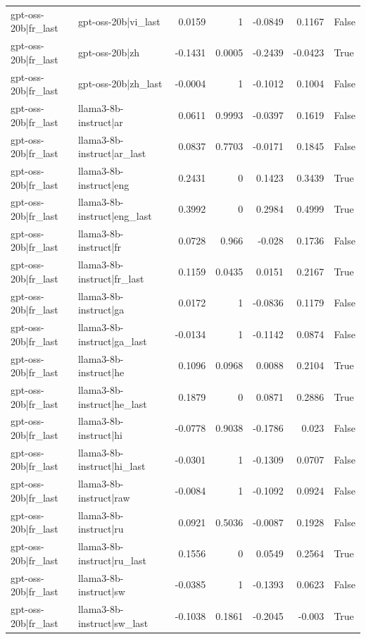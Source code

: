 \begin{table}
\begin{tabular}{l l r r r r l}
gpt-oss-20b|fr_last & gpt-oss-20b|vi_last & 0.0159 & 1 & -0.0849 & 0.1167 & False \\
gpt-oss-20b|fr_last & gpt-oss-20b|zh & -0.1431 & 0.0005 & -0.2439 & -0.0423 & True \\
gpt-oss-20b|fr_last & gpt-oss-20b|zh_last & -0.0004 & 1 & -0.1012 & 0.1004 & False \\
gpt-oss-20b|fr_last & llama3-8b-instruct|ar & 0.0611 & 0.9993 & -0.0397 & 0.1619 & False \\
gpt-oss-20b|fr_last & llama3-8b-instruct|ar_last & 0.0837 & 0.7703 & -0.0171 & 0.1845 & False \\
gpt-oss-20b|fr_last & llama3-8b-instruct|eng & 0.2431 & 0 & 0.1423 & 0.3439 & True \\
gpt-oss-20b|fr_last & llama3-8b-instruct|eng_last & 0.3992 & 0 & 0.2984 & 0.4999 & True \\
gpt-oss-20b|fr_last & llama3-8b-instruct|fr & 0.0728 & 0.966 & -0.028 & 0.1736 & False \\
gpt-oss-20b|fr_last & llama3-8b-instruct|fr_last & 0.1159 & 0.0435 & 0.0151 & 0.2167 & True \\
gpt-oss-20b|fr_last & llama3-8b-instruct|ga & 0.0172 & 1 & -0.0836 & 0.1179 & False \\
gpt-oss-20b|fr_last & llama3-8b-instruct|ga_last & -0.0134 & 1 & -0.1142 & 0.0874 & False \\
gpt-oss-20b|fr_last & llama3-8b-instruct|he & 0.1096 & 0.0968 & 0.0088 & 0.2104 & True \\
gpt-oss-20b|fr_last & llama3-8b-instruct|he_last & 0.1879 & 0 & 0.0871 & 0.2886 & True \\
gpt-oss-20b|fr_last & llama3-8b-instruct|hi & -0.0778 & 0.9038 & -0.1786 & 0.023 & False \\
gpt-oss-20b|fr_last & llama3-8b-instruct|hi_last & -0.0301 & 1 & -0.1309 & 0.0707 & False \\
gpt-oss-20b|fr_last & llama3-8b-instruct|raw & -0.0084 & 1 & -0.1092 & 0.0924 & False \\
gpt-oss-20b|fr_last & llama3-8b-instruct|ru & 0.0921 & 0.5036 & -0.0087 & 0.1928 & False \\
gpt-oss-20b|fr_last & llama3-8b-instruct|ru_last & 0.1556 & 0 & 0.0549 & 0.2564 & True \\
gpt-oss-20b|fr_last & llama3-8b-instruct|sw & -0.0385 & 1 & -0.1393 & 0.0623 & False \\
gpt-oss-20b|fr_last & llama3-8b-instruct|sw_last & -0.1038 & 0.1861 & -0.2045 & -0.003 & True \\

\end{tabular}
\end{table}
